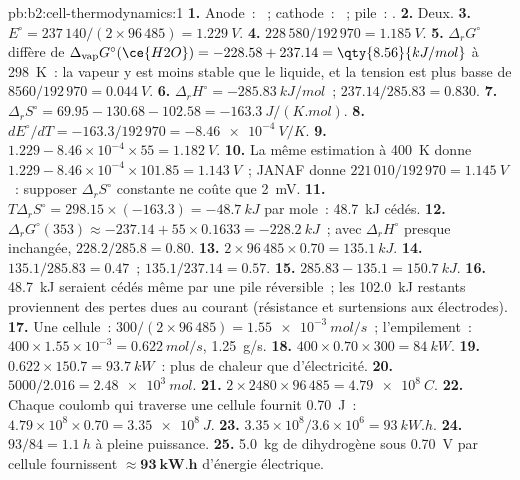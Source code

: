 \begin{solution}{pb:b2:cell-thermodynamics:1}
\textbf{1.} Anode~: ~; cathode~: ~;
pile~: .
\textbf{2.} Deux.
\textbf{3.} $E^\circ = 237\,140/(2 \times 96\,485) = \qty{1.229}{V}$.
\textbf{4.} $228\,580/192\,970 = \qty{1.185}{V}$.
\textbf{5.} $\Delta_r G^\circ$ diffère de $\Delta_{\text{vap}}G^\circ(\ce{H2O}) = -228.58 + 237.14 =
\qty{8.56}{kJ/mol}$ à \qty{298}{K}~: la vapeur y est moins stable que le liquide, et la
tension est plus basse de $8560/192\,970 = \qty{0.044}{V}$.
\textbf{6.} $\Delta_r H^\circ = \qty{-285.83}{kJ/mol}$~; $237.14/285.83 = 0.830$.
\textbf{7.} $\Delta_r S^\circ = 69.95 - 130.68 - 102.58 = \qty{-163.3}{J/(K.mol)}$.
\textbf{8.} $dE^\circ/dT = -163.3/192\,970 = \qty{-8.46e-4}{V/K}$.
\textbf{9.} $1.229 - 8.46 \times 10^{-4} \times 55 = \qty{1.182}{V}$.
\textbf{10.} La même estimation à \qty{400}{K} donne $1.229 - 8.46 \times 10^{-4}
\times 101.85 = \qty{1.143}{V}$~; JANAF donne $221\,010/192\,970 = \qty{1.145}{V}$~:
supposer $\Delta_r S^\circ$ constante ne coûte que \qty{2}{mV}.
\textbf{11.} $T\Delta_r S^\circ = 298.15 \times (-163.3) = \qty{-48.7}{kJ}$ par mole~:
\qty{48.7}{kJ} cédés.
\textbf{12.} $\Delta_r G^\circ(353) \approx -237.14 + 55 \times 0.1633 =
\qty{-228.2}{kJ}$~; avec $\Delta_r H^\circ$ presque inchangée, $228.2/285.8 = 0.80$.
\textbf{13.} $2 \times 96\,485 \times 0.70 = \qty{135.1}{kJ}$.
\textbf{14.} $135.1/285.83 = 0.47$~; $135.1/237.14 = 0.57$.
\textbf{15.} $285.83 - 135.1 = \qty{150.7}{kJ}$.
\textbf{16.} \qty{48.7}{kJ} seraient cédés même par une pile réversible~; les
\qty{102.0}{kJ} restants proviennent des pertes dues au courant (résistance et surtensions
aux électrodes).
\textbf{17.} Une cellule~: $300/(2 \times 96\,485) = \qty{1.55e-3}{mol/s}$~; l'empilement~:
$400 \times 1.55 \times 10^{-3} = \qty{0.622}{mol/s}$, \qty{1.25}{g/s}.
\textbf{18.} $400 \times 0.70 \times 300 = \qty{84}{kW}$.
\textbf{19.} $0.622 \times 150.7 = \qty{93.7}{kW}$~: plus de chaleur que d'électricité.
\textbf{20.} $5000/2.016 = \qty{2.48e3}{mol}$.
\textbf{21.} $2 \times 2480 \times 96\,485 = \qty{4.79e8}{C}$.
\textbf{22.} Chaque coulomb qui traverse une cellule fournit \qty{0.70}{J}~: $4.79 \times
10^8 \times 0.70 = \qty{3.35e8}{J}$.
\textbf{23.} $3.35 \times 10^8/3.6 \times 10^6 = \qty{93}{kW.h}$.
\textbf{24.} $93/84 = \qty{1.1}{h}$ à pleine puissance.
\textbf{25.} \qty{5.0}{kg} de dihydrogène sous \qty{0.70}{V} par cellule fournissent
$\boldsymbol{\approx \qty{93}{kW.h}}$ d'énergie électrique.
\end{solution}
